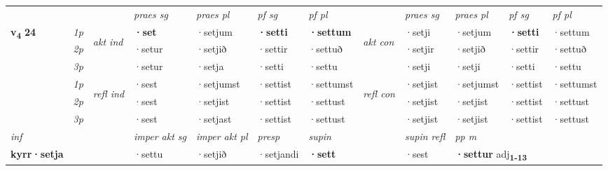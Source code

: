 \begin{longtable}[l]{X>{\footnotesize\itshape}llXXXXlXXXX}
 & &   & \textit{praes sg}  & \textit{praes pl}    & \textit{ pf sg} & \textit{pf pl} & & \textit{praes sg}  & \textit{praes pl}    & \textit{pf sg} & \textit{pf pl }  \\ \cmidrule{4-7} \cmidrule{9-12}
 \multirow{2}{*}{{{\textbf{v{\textsubscript{4}}} \Large{\textbf{24}}}}}  & 1p & \multirow{3}{*}{\begin{turn}{90}\textit{akt ind}\end{turn}} & \textbf{·set} & ·setjum & \textbf{·setti} & \textbf{·settum} & \multirow{3}{*}{\begin{turn}{90}\textit{akt con}\end{turn}} &·setji & ·setjum & \textbf{·setti} & ·settum\\*
 & 2p &  &  ·setur  & ·setjið & ·settir & ·settuð & & ·setjir & ·setjið & ·settir & ·settuð \\*
 & 3p &  & ·setur & ·setja & ·setti & ·settu & & ·setji & ·setji& ·setti & ·settu \\*
\cmidrule{4-7} \cmidrule{9-12}
 & 1p & \multirow{3}{*}{\begin{turn}{90}\textit{refl ind}\end{turn}}  & ·sest & ·setjumst & ·settist & ·settumst & \multirow{3}{*}{\begin{turn}{90}\textit{refl con}\end{turn}}  &·setjist & ·setjumst & ·settist & ·settumst \\*
 & 2p &  & ·sest & ·setjist & ·settist & ·settust & &·setjist & ·setjist & ·settist & ·settust \\*
 & 3p  & & ·sest & ·setjast & ·settist & ·settust & & ·setjist & ·setjist& ·settist & ·settust \\*
\cmidrule{4-7} \cmidrule{9-12}

   {\textit{inf}} & &  & \textit{imper akt sg} & \textit{imper akt pl}   & \textit{presp} & \textit{supin} && \textit{supin refl} & \textit{pp m} \\*
  {\textbf{kyrr\allowbreak ·setja}} & && ·settu  & ·setjið   & ·setjandi &  \textbf{·sett} && ·sest & \multicolumn{2}{l}{\textbf{·settur} adj\textbf{\textsubscript{1-13}}} \\*

\midrule


\end{longtable}
